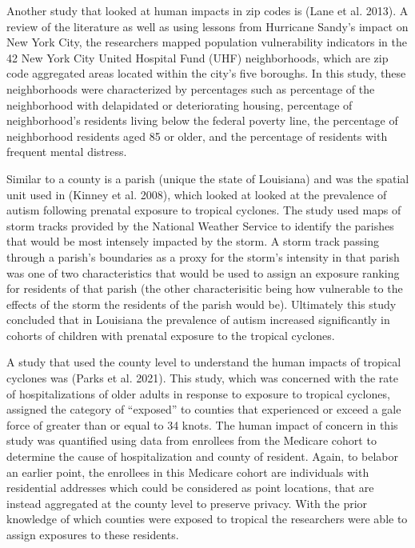 \documentclass[
]{article}
\begin{document}
Another study that looked at human impacts in zip codes is (Lane et al.
2013). A review of the literature as well as using lessons from
Hurricane Sandy's impact on New York City, the researchers mapped
population vulnerability indicators in the 42 New York City United
Hospital Fund (UHF) neighborhoods, which are zip code aggregated areas
located within the city's five boroughs. In this study, these
neighborhoods were characterized by percentages such as percentage of
the neighborhood with delapidated or deteriorating housing, percentage
of neighborhood's residents living below the federal poverty line, the
percentage of neighborhood residents aged 85 or older, and the
percentage of residents with frequent mental distress.

Similar to a county is a parish (unique the state of Louisiana) and was
the spatial unit used in (Kinney et al. 2008), which looked at looked at
the prevalence of autism following prenatal exposure to tropical
cyclones. The study used maps of storm tracks provided by the National
Weather Service to identify the parishes that would be most intensely
impacted by the storm. A storm track passing through a parish's
boundaries as a proxy for the storm's intensity in that parish was one
of two characteristics that would be used to assign an exposure ranking
for residents of that parish (the other characterisitic being how
vulnerable to the effects of the storm the residents of the parish would
be). Ultimately this study concluded that in Louisiana the prevalence of
autism increased significantly in cohorts of children with prenatal
exposure to the tropical cyclones.

A study that used the county level to understand the human impacts of
tropical cyclones was (Parks et al. 2021). This study, which was
concerned with the rate of hospitalizations of older adults in response
to exposure to tropical cyclones, assigned the category of ``exposed''
to counties that experienced or exceed a gale force of greater than or
equal to 34 knots. The human impact of concern in this study was
quantified using data from enrollees from the Medicare cohort to
determine the cause of hospitalization and county of resident. Again, to
belabor an earlier point, the enrollees in this Medicare cohort are
individuals with residential addresses which could be considered as
point locations, that are instead aggregated at the county level to
preserve privacy. With the prior knowledge of which counties were
exposed to tropical the researchers were able to assign exposures to
these residents.
\end{document}
